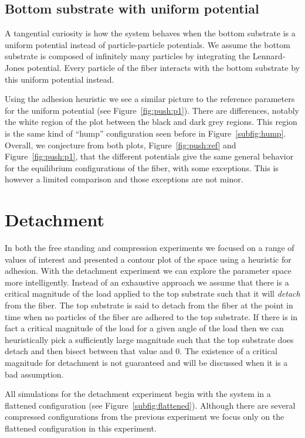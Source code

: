 \subsection{Bottom substrate with uniform potential} \label{section:compression:pressure}

A tangential curiosity is how the system behaves when the bottom substrate is a uniform potential instead of particle-particle potentials. We assume the bottom substrate is composed of infinitely many particles by integrating the Lennard-Jones potential. Every particle of the fiber interacts with the bottom substrate by this uniform potential instead.

Using the adhesion heuristic we see a similar picture to the reference parameters for the uniform potential (see Figure~\ref{fig:push:p1}). There are differences, notably the white region of the plot between the black and dark grey regions. This region is the same kind of ``hump'' configuration seen before in Figure~\ref{subfig:hump}. Overall, we conjecture from both plots, Figure~\ref{fig:push:ref} and Figure~\ref{fig:push:p1}, that the different potentials give the same general behavior for the equilibrium configurations of the fiber, with some exceptions. This is however a limited comparison and those exceptions are not minor.

\section{Detachment} \label{ch:detachment}

In both the free standing and compression experiments we focused on a range of values of interest and presented a contour plot of the space using a heuristic for adhesion. With the detachment experiment we can explore the parameter space more intelligently. Instead of an exhaustive approach we assume that there is a critical magnitude of the load applied to the top substrate such that it will \textit{detach} from the fiber. The top substrate is said to detach from the fiber at the point in time when no particles of the fiber are adhered to the top substrate. If there is in fact a critical magnitude of the load for a given angle of the load then we can heuristically pick a sufficiently large magnitude such that the top substrate does detach and then bisect between that value and $0$. The existence of a critical magnitude for detachment is not guaranteed and will be discussed when it is a bad assumption.

All simulations for the detachment experiment begin with the system in a flattened configuration (see Figure~\ref{subfig:flattened}). Although there are several compressed configurations from the previous experiment we focus only on the flattened configuration in this experiment.

